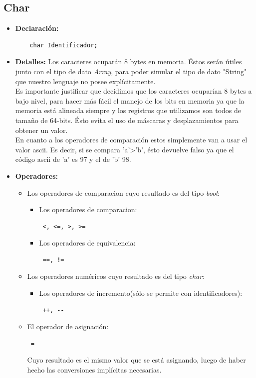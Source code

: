 \documentclass[11pt, spanish]{report}
\begin{document}
\subsection{Char}
\begin{itemize}
\item \textbf{Declaraci\'on:}
  \begin{verbatim}
    char Identificador;
  \end{verbatim}
\item \textbf{Detalles:}
  Los caracteres ocupar\'an 8 bytes en memoria. \'Estos ser\'an \'utiles junto con el tipo de dato \emph{Array}, para poder simular el 
  tipo de dato "String" que nuestro lenguaje no posee expl\'icitamente.\\

  Es importante justificar que decidimos que los caracteres ocupar\'ian 8 bytes a bajo nivel, para hacer m\'as f\'acil el manejo de los bits
  en memoria ya que la memoria est\'a alineada siempre y los registros que utilizamos son todos de tama\~no de 64-bits. \'Esto evita
  el uso de máscaras y desplazamientos para obtener un valor.\\

  En cuanto a los operadores de comparaci\'on estos simplemente van a usar el valor ascii. Es decir, si se compara 'a'>'b', \'esto devuelve falso
  ya que el c\'odigo ascii de 'a' es 97 y el de 'b' 98.\\

\item \textbf{Operadores:}
  \begin{itemize}
  \item Los operadores de comparacion cuyo resultado es del tipo \emph{bool}: 
    \begin{itemize}
    \item Los operadores de comparacion: \begin{verbatim} <, <=, >, >= \end{verbatim}
    \item Los operadores de equivalencia: \begin{verbatim} ==, != \end{verbatim}
    \end{itemize}
  \item Los operadores num\'ericos cuyo resultado es del tipo \emph{char}:
    \begin{itemize}
    \item Los operadores de incremento(s\'olo se permite con identificadores): \begin{verbatim} ++, -- \end{verbatim}
    \end{itemize}
  \item El operador de asignaci\'on:
    \begin{verbatim} = \end{verbatim}
    Cuyo resultado es el mismo valor que se est\'a asignando, luego de haber hecho las conversiones impl\'icitas necesarias.
  \end{itemize}
\end{itemize}
\end{document}

